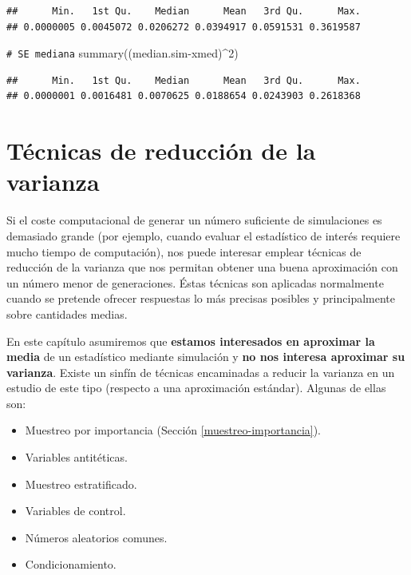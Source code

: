 \documentclass[
]{book}
\newenvironment{Shaded}{\begin{snugshade}}{\end{snugshade}}
\newcommand{\CommentTok}[1]{\textcolor[rgb]{0.56,0.35,0.01}{\textit{#1}}}
\newcommand{\DecValTok}[1]{\textcolor[rgb]{0.00,0.00,0.81}{#1}}
\newcommand{\FunctionTok}[1]{\textcolor[rgb]{0.00,0.00,0.00}{#1}}
\newcommand{\NormalTok}[1]{#1}
\newcommand{\SpecialCharTok}[1]{\textcolor[rgb]{0.00,0.00,0.00}{#1}}
\theoremstyle{break}
\theoremstyle{nonumberplain}
\renewcommand{\CommentTok}[1]{\textcolor[rgb]{0.41,0.41,0.41}{\texttt{#1}}}
\begin{document}
\begin{enumerate}
\begin{verbatim}
##      Min.   1st Qu.    Median      Mean   3rd Qu.      Max. 
## 0.0000005 0.0045072 0.0206272 0.0394917 0.0591531 0.3619587
\end{verbatim}

\begin{Shaded}
\begin{Highlighting}[]
\CommentTok{\# SE mediana}
\FunctionTok{summary}\NormalTok{((median.sim}\SpecialCharTok{{-}}\NormalTok{xmed)}\SpecialCharTok{\^{}}\DecValTok{2}\NormalTok{) }
\end{Highlighting}
\end{Shaded}

\begin{verbatim}
##      Min.   1st Qu.    Median      Mean   3rd Qu.      Max. 
## 0.0000001 0.0016481 0.0070625 0.0188654 0.0243903 0.2618368
\end{verbatim}
\end{enumerate}

\hypertarget{tuxe9cnicas-de-reducciuxf3n-de-la-varianza}{%
\chapter{Técnicas de reducción de la varianza}\label{tuxe9cnicas-de-reducciuxf3n-de-la-varianza}}

Si el coste computacional de generar un número suficiente de simulaciones es demasiado grande (por ejemplo, cuando evaluar el estadístico de interés requiere mucho tiempo de computación), nos puede interesar emplear técnicas de reducción de la varianza que nos permitan obtener una buena aproximación con un número menor de generaciones. Éstas técnicas son aplicadas normalmente cuando se pretende ofrecer respuestas lo más precisas posibles y principalmente sobre cantidades medias.

En este capítulo asumiremos que \textbf{estamos interesados en aproximar la media} de un estadístico mediante simulación y \textbf{no nos interesa aproximar su varianza}.
Existe un sinfín de técnicas encaminadas a reducir la varianza en un estudio de este tipo (respecto a una aproximación estándar).
Algunas de ellas son:

\begin{itemize}
\item
  Muestreo por importancia (Sección \ref{muestreo-importancia}).
\item
  Variables antitéticas.
\item
  Muestreo estratificado.
\item
  Variables de control.
\item
  Números aleatorios comunes.
\item
  Condicionamiento.
\end{itemize}
\end{document}
